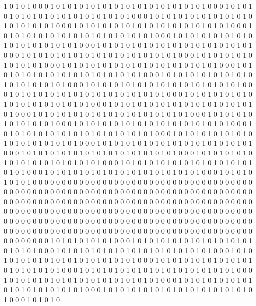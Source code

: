 1 0 1 0 1 0 0 0 1 0 1 0 1 0 1 0 1 0 1 0 1 0 1 0 1 0 1 0 1 0 1 0 1 0 1 0 0 0 1 0 1 0 1 0 1 0 1 0 1 0 1 0 1 0 1 0 1 0 1 0 1 0 1 0 1 0 0 0 1 0 1 0 1 0 1 0 1 0 1 0 1 0 1 0 1 0 1 0 1 0 1 0 1 0 1 0 0 0 1 0 1 0 1 0 1 0 1 0 1 0 1 0 1 0 1 0 1 0 1 0 1 0 1 0 1 0 0 0 1 0 1 0 1 0 1 0 1 0 1 0 1 0 1 0 1 0 1 0 1 0 1 0 1 0 1 0 0 0 1 0 1 0 1 0 1 0 1 0 1 0 1 0 1 0 1 0 1 0 1 0 1 0 1 0 1 0 0 0 1 0 1 0 1 0 1 0 1 0 1 0 1 0 1 0 1 0 1 0 1 0 1 0 1 0 1 0 0 0 1 0 1 0 1 0 1 0 1 0 1 0 1 0 1 0 1 0 1 0 1 0 1 0 1 0 1 0 0 0 1 0 1 0 1 0 1 0 1 0 1 0 
1 0 1 0 1 0 0 0 1 0 1 0 1 0 1 0 1 0 1 0 1 0 1 0 1 0 1 0 1 0 1 0 1 0 1 0 0 0 1 0 1 0 1 0 1 0 1 0 1 0 1 0 1 0 1 0 1 0 1 0 1 0 1 0 1 0 0 0 1 0 1 0 1 0 1 0 1 0 1 0 1 0 1 0 1 0 1 0 1 0 1 0 1 0 1 0 0 0 1 0 1 0 1 0 1 0 1 0 1 0 1 0 1 0 1 0 1 0 1 0 1 0 1 0 1 0 0 0 1 0 1 0 1 0 1 0 1 0 1 0 1 0 1 0 1 0 1 0 1 0 1 0 1 0 1 0 0 0 1 0 1 0 1 0 1 0 1 0 1 0 1 0 1 0 1 0 1 0 1 0 1 0 1 0 1 0 0 0 1 0 1 0 1 0 1 0 1 0 1 0 1 0 1 0 1 0 1 0 1 0 1 0 1 0 1 0 0 0 1 0 1 0 1 0 1 0 1 0 1 0 1 0 1 0 1 0 1 0 1 0 1 0 1 0 1 0 0 0 1 0 1 0 1 0 1 0 1 0 1 0 
1 0 1 0 1 0 0 0 1 0 1 0 1 0 1 0 1 0 1 0 1 0 1 0 1 0 1 0 1 0 1 0 1 0 1 0 0 0 1 0 1 0 1 0 1 0 1 0 1 0 1 0 1 0 1 0 1 0 1 0 1 0 1 0 1 0 0 0 1 0 1 0 1 0 1 0 1 0 1 0 1 0 1 0 1 0 1 0 1 0 1 0 1 0 1 0 0 0 1 0 1 0 1 0 1 0 1 0 1 0 1 0 1 0 1 0 1 0 1 0 1 0 1 0 1 0 0 0 1 0 1 0 1 0 1 0 1 0 1 0 1 0 1 0 1 0 1 0 1 0 1 0 1 0 1 0 0 0 1 0 1 0 1 0 1 0 1 0 1 0 1 0 1 0 1 0 1 0 1 0 1 0 1 0 1 0 0 0 1 0 1 0 1 0 1 0 1 0 1 0 1 0 1 0 1 0 1 0 1 0 1 0 1 0 1 0 0 0 1 0 1 0 1 0 1 0 1 0 1 0 1 0 1 0 1 0 1 0 1 0 1 0 1 0 1 0 0 0 1 0 1 0 1 0 1 0 1 0 1 0 
0 0 0 0 0 0 0 0 0 0 0 0 0 0 0 0 0 0 0 0 0 0 0 0 0 0 0 0 0 0 0 0 0 0 0 0 0 0 0 0 0 0 0 0 0 0 0 0 0 0 0 0 0 0 0 0 0 0 0 0 0 0 0 0 0 0 0 0 0 0 0 0 0 0 0 0 0 0 0 0 0 0 0 0 0 0 0 0 0 0 0 0 0 0 0 0 0 0 0 0 0 0 0 0 0 0 0 0 0 0 0 0 0 0 0 0 0 0 0 0 0 0 0 0 0 0 0 0 0 0 0 0 0 0 0 0 0 0 0 0 0 0 0 0 0 0 0 0 0 0 0 0 0 0 0 0 0 0 0 0 0 0 0 0 0 0 0 0 0 0 0 0 0 0 0 0 0 0 0 0 0 0 0 0 0 0 0 0 0 0 0 0 0 0 0 0 0 0 0 0 0 0 0 0 0 0 0 0 0 0 0 0 0 0 0 0 0 0 0 0 0 0 0 0 0 0 0 0 0 0 0 0 0 0 0 0 0 0 0 0 0 0 0 0 0 0 0 0 0 0 0 0 0 0 0 0 0 0 0 0 
1 0 1 0 1 0 1 0 1 0 1 0 0 0 1 0 1 0 1 0 1 0 1 0 1 0 1 0 1 0 1 0 1 0 1 0 1 0 1 0 1 0 0 0 1 0 1 0 1 0 1 0 1 0 1 0 1 0 1 0 1 0 1 0 1 0 1 0 1 0 1 0 0 0 1 0 1 0 1 0 1 0 1 0 1 0 1 0 1 0 1 0 1 0 1 0 1 0 1 0 1 0 0 0 1 0 1 0 1 0 1 0 1 0 1 0 1 0 1 0 1 0 1 0 1 0 1 0 1 0 1 0 0 0 1 0 1 0 1 0 1 0 1 0 1 0 1 0 1 0 1 0 1 0 1 0 1 0 1 0 1 0 0 0 1 0 1 0 1 0 1 0 1 0 1 0 1 0 1 0 1 0 1 0 1 0 1 0 1 0 1 0 0 0 1 0 1 0 1 0 1 0 1 0 1 0 1 0 1 0 1 0 1 0 1 0 1 0 1 0 1 0 0 0 1 0 1 0 1 0 1 0 1 0 1 0 1 0 1 0 1 0 1 0 1 0 1 0 1 0 1 0 0 0 1 0 1 0 1 0 
